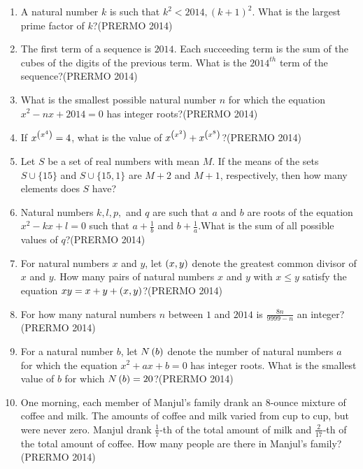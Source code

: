 \begin{enumerate}
   \item A natural number $k$ is such that $k^2 < 2014 , (k+1)^2$. What is the largest prime factor of $k$?\hfill(PRERMO 2014)
   \item The first term of a sequence is $2014$. Each succeeding term is the sum of the cubes of the digits of the previous term. What is the $2014^{th}$ term of the sequence?\hfill(PRERMO 2014)
   \item What is the smallest possible natural number $n$ for which the equation $x^2 - nx + 2014 = 0$ has integer roots?\hfill(PRERMO 2014)
   \item If $x^{\left(x^4\right)} = 4$, what is the value of $x^{\left(x^2\right)} + x^{\left(x^8\right)}$?\hfill(PRERMO 2014)
   \item Let $S$ be a set of real numbers with mean $M$. If the means of the sets $S \cup \{15\}$ and $S \cup \{15, 1\}$ are $M + 2$ and $M + 1$, respectively, then how many elements does $S$ have?
   \item Natural numbers $k, l, p,$ and $q$ are such that $a$ and $b$ are roots of the equation $x^2 - kx + l = 0$ such that $a + \frac{1}{b}$ and $b + \frac{1}{a}.$What is the sum of all possible values of $q$?\hfill(PRERMO 2014)
   \item For natural numbers $x$ and $y$, let $\left(x, y\right)$ denote the greatest common divisor of $x$ and $y$. How many pairs of natural numbers $x$ and $y$ with $x \leq y$ satisfy the equation $xy = x + y + \left(x, y\right)$?\hfill(PRERMO 2014)
   \item For how many natural numbers $n$ between $1$ and $2014$  is $\frac{8n}{9999 - n}$ an integer?\hfill(PRERMO 2014)
   \item For a natural number $b$, let $N\left(b\right)$ denote the number of natural numbers $a$ for which the equation $x^2 + ax + b = 0$ has integer roots. What is the smallest value of $b$ for which $N\left(b\right) = 20$?\hfill(PRERMO 2014)
    \item One morning, each member of Manjul's family drank an 8-ounce mixture of coffee and milk. The amounts of coffee and milk varied from cup to cup, but were never zero. Manjul drank $\frac{1}{7}$-th of the total amount of milk and $\frac{2}{17}$-th of the total amount of coffee. How many people are there in Manjul's family?\hfill(PRERMO 2014)
\end{enumerate}
